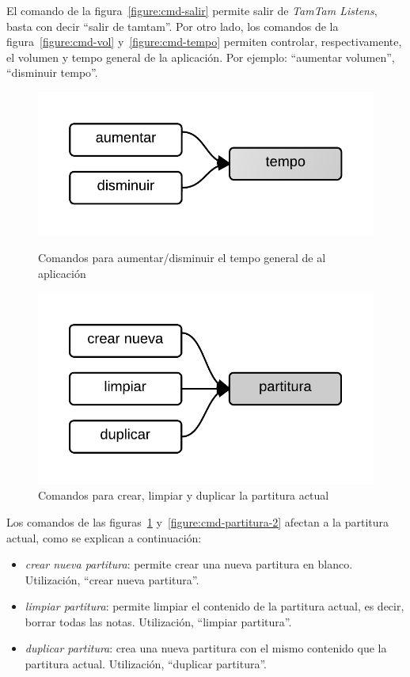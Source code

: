 El comando de la figura~\ref{figure:cmd-salir} permite salir de \emph{TamTam Listens}, basta con decir
``salir de tamtam''. Por otro lado, los comandos de la figura~\ref{figure:cmd-vol}
y~\ref{figure:cmd-tempo} permiten controlar, respectivamente, el volumen y tempo general de la aplicaci\'on. Por ejemplo: ``aumentar volumen'', ``disminuir tempo''.

\begin{figure}[H]
\begin{minipage}[b]{0.5\linewidth}
\centering
\includegraphics[width=0.6\linewidth]{./graphics/cmd-tempo.png}
\caption{Comandos para aumentar/disminuir el tempo general de al aplicaci\'on}
\label{figure:cmd-tempo}
\end{minipage}
\quad
\begin{minipage}[b]{0.5\linewidth}
\centering
\includegraphics[width=0.6\linewidth]{./graphics/partitura-1.png}
\caption{Comandos para crear, limpiar y duplicar la partitura actual}
\label{figure:cmd-partitura-1}
\end{minipage}
\end{figure}

Los comandos de las figuras~\ref{figure:cmd-partitura-1} y~\ref{figure:cmd-partitura-2} afectan a
la partitura actual, como se explican a continuaci\'on:

\begin{itemize}
    \item \emph{crear nueva  partitura}:  permite crear una nueva partitura en blanco. Utilizaci\'on, 
    ``crear nueva partitura''.
    \item \emph{limpiar  partitura}: permite limpiar el contenido de la partitura actual, es decir, 
    borrar todas las notas. Utilizaci\'on, ``limpiar partitura''.
    \item \emph{duplicar partitura}: crea una nueva partitura con el mismo contenido que la partitura 
    actual. Utilizaci\'on, ``duplicar partitura''.
\end{itemize}

